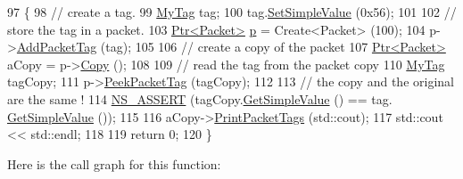 \begin{DoxyCode}
97 \{
98   \textcolor{comment}{// create a tag.}
99   \hyperlink{classMyTag}{MyTag} tag;
100   tag.\hyperlink{classMyTag_a662c03c129cbd44b5cb29c63f518dcdd}{SetSimpleValue} (0x56);
101 
102   \textcolor{comment}{// store the tag in a packet.}
103   \hyperlink{classns3_1_1Ptr}{Ptr<Packet>} \hyperlink{lte__link__budget_8m_ac9de518908a968428863f829398a4e62}{p} = Create<Packet> (100);
104   p->\hyperlink{classns3_1_1Packet_a7400b8655852f5271c5957250d0141af}{AddPacketTag} (tag);
105 
106   \textcolor{comment}{// create a copy of the packet}
107   \hyperlink{classns3_1_1Ptr}{Ptr<Packet>} aCopy = p->\hyperlink{classns3_1_1Packet_a5d5c70802a5f77fc5f0001e0cfc1898b}{Copy} ();
108 
109   \textcolor{comment}{// read the tag from the packet copy}
110   \hyperlink{classMyTag}{MyTag} tagCopy;
111   p->\hyperlink{classns3_1_1Packet_a1734de11f2ca1e78a7872461a0625168}{PeekPacketTag} (tagCopy);
112 
113   \textcolor{comment}{// the copy and the original are the same !}
114   \hyperlink{assert_8h_a6dccdb0de9b252f60088ce281c49d052}{NS\_ASSERT} (tagCopy.\hyperlink{classMyTag_a353be1fb83a0fa6728ab5d1924585efb}{GetSimpleValue} () == tag.
      \hyperlink{classMyTag_a353be1fb83a0fa6728ab5d1924585efb}{GetSimpleValue} ());
115 
116   aCopy->\hyperlink{classns3_1_1Packet_a260fecda6a32bfc24e16a950e7d91559}{PrintPacketTags} (std::cout);
117   std::cout << std::endl;
118 
119   \textcolor{keywordflow}{return} 0;
120 \}
\end{DoxyCode}


Here is the call graph for this function\+:


